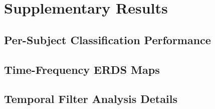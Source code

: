 \chapter{Supplementary Results}
\label{app:supplementary_results}



\section{Per-Subject Classification Performance}
\label{app:per_subject_performance}

%
%


\section{Time-Frequency ERDS Maps}
\label{app:erds_maps}

%
%


\section{Temporal Filter Analysis Details}
\label{app:temporal_filters}

%
%


